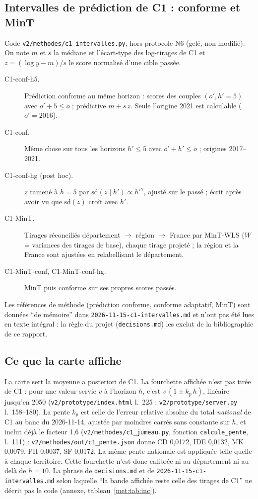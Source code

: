 \subsection{Intervalles de prédiction de C1 : conforme et MinT}
\label{met:intervalles}
Code \texttt{v2/methodes/c1\_intervalles.py}, hors protocole N6 (gelé, non modifié). On note $m$ et $s$ la
médiane et l'écart-type des log-tirages de C1 et $z = (\log y - m)/s$ le score normalisé d'une cible
passée.
\begin{description}
  \item[C1-conf-h5.] Prédiction conforme au même horizon : scores des couples $(o', h' = 5)$ avec
    $o' + 5 \le o$ ; prédictive $m + s\,z$. Seule l'origine 2021 est calculable ($o' = 2016$).
  \item[C1-conf.] Même chose sur tous les horizons $h' \le 5$ avec $o' + h' \le o$ ; origines 2017--2021.
  \item[C1-conf-hg (post hoc).] $z$ ramené à $h = 5$ par $\mathrm{sd}(z \mid h') \propto h'^{\gamma}$, ajusté
    sur le passé ; écrit après avoir vu que $\mathrm{sd}(z)$ croît avec $h'$.
  \item[C1-MinT.] Tirages réconciliés département $\to$ région $\to$ France par MinT-WLS ($W$ = variances des
    tirages de base), chaque tirage projeté ; la région et la France sont ajustées en relabellisant le
    département.
  \item[C1-MinT-conf, C1-MinT-conf-hg.] MinT puis conforme sur ses propres scores passés.
\end{description}
Les références de méthode (prédiction conforme, conforme adaptatif, MinT) sont données \enquote{de mémoire}
dans \texttt{2026-11-15-c1-intervalles.md} et n'ont pas été lues en texte intégral : la règle du projet
(\texttt{decisions.md}) les exclut de la bibliographie de ce rapport.

\subsection{Ce que la carte affiche}
\label{met:servi}
La carte sert la moyenne a posteriori de C1. La fourchette affichée n'est pas tirée de C1 : pour une valeur
servie $v$ à l'horizon $h$, c'est $v\,(1 \pm k_p\,h)$, linéaire jusqu'en 2050
(\texttt{v2/prototype/index.html} l.~225 ; \texttt{v2/prototype/server.py} l.~158--180). La pente $k_p$ est
celle de l'erreur relative absolue du total \emph{national} de C1 au banc du 2026-11-14, ajustée par moindres
carrés sans constante sur $h$, et inclut déjà le facteur 1,6 (\texttt{v2/methodes/c1\_jumeau.py}, fonction
\texttt{calcule\_pente}, l.~111) : \texttt{v2/methodes/out/c1\_pente.json} donne CD 0,0172\mesure,
IDE 0,0132\mesure, MK 0,0079\mesure, PH 0,0037\mesure, SF 0,0172\mesure. La même pente nationale est
appliquée telle quelle à chaque territoire. Cette fourchette n'est donc calibrée ni au département ni au-delà
de $h = 10$. La phrase de \texttt{decisions.md} et de \texttt{2026-11-15-c1-intervalles.md} selon laquelle
\enquote{la bande affichée reste celle des tirages de C1} ne décrit pas le code (annexe,
tableau~\ref{met:tab:inc}).


